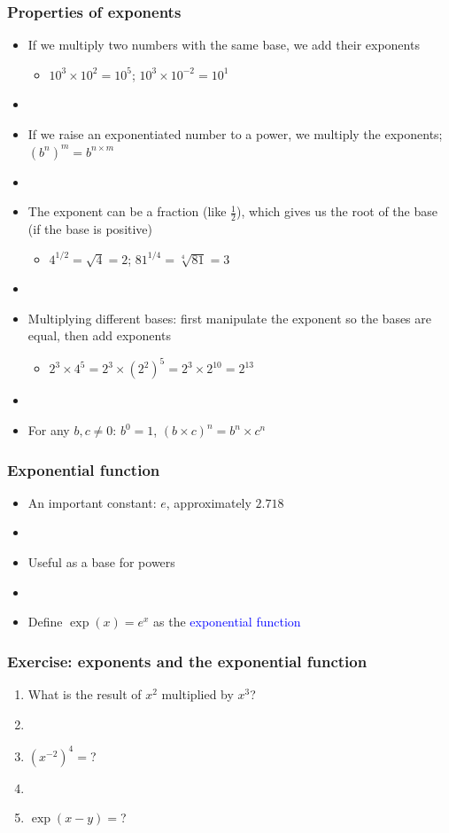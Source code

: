 \documentclass[11pt]{beamer}
\newcommand{\myframe}[1]{\begin{frame} \frametitle{#1}}
\begin{document}
\myframe{Properties of exponents}
\fontsize{9pt}{7.2}\selectfont
\begin{itemize}
\item If we multiply two numbers with the same base, we add their exponents \pause
\begin{itemize}
\item $10^3 \times 10^2 = 10^5$; $10^3 \times 10^{-2} = 10^1$
\end{itemize}
\item[] \pause
\item If we raise an exponentiated number to a power, we multiply the exponents; $(b^n)^m = b^{n\times m}$
\item[] \pause
\item The exponent can be a fraction (like $\frac{1}{2}$), which gives us the root of the base (if the base is positive) \pause
\begin{itemize}
\item $4^{1/2} = \sqrt{4} = 2$; $81^{1/4} = \sqrt[4]{81} = 3$
\end{itemize}
\item[] \pause
\item Multiplying different bases: first manipulate the exponent so the bases are equal, then add exponents \pause
\begin{itemize}
\item $2^3 \times 4^5 = 2^3 \times (2^2)^5 = 2^3 \times 2^{10} = 2^{13}$
\end{itemize}
\item[] \pause
\item For any $b, c \neq 0$: $b^0 = 1$, $(b \times c)^n = b^n \times c^n$
\end{itemize}
\end{frame}

\myframe{Exponential function}
\begin{itemize}
\item An important constant: $e$, approximately $2.718$
\item[] \pause
\item Useful as a base for powers
\item[] \pause
\item Define $\exp(x) = e^x$ as the \textcolor{blue}{exponential function}
\end{itemize}
\end{frame}

\myframe{Exercise: exponents and the exponential function}
\begin{enumerate}
\item What is the result of $x^2$ multiplied by $x^3$?
\item[]
\item $(x^{-2})^4 = $?
\item[]
\item $\exp(x - y) = $?
\end{enumerate}
\end{frame}
\end{document}
